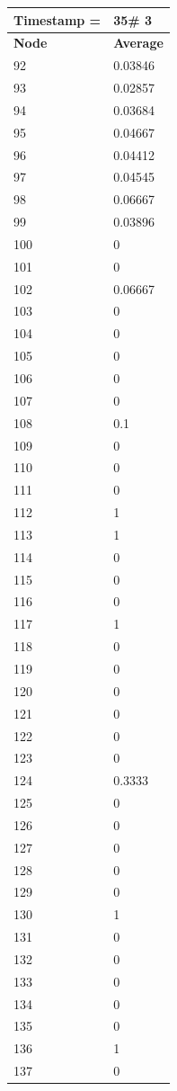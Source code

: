 \begin{tabular}{|l||l|}
\hline
\textbf{Timestamp =} & \textbf{35}\# 3\\\hline
	\textbf{Node} & \textbf{Average} \\ \hline
\hline
	92 & 0.03846 \\ \hline
	93 & 0.02857 \\ \hline
	94 & 0.03684 \\ \hline
	95 & 0.04667 \\ \hline
	96 & 0.04412 \\ \hline
	97 & 0.04545 \\ \hline
	98 & 0.06667 \\ \hline
	99 & 0.03896 \\ \hline
	100 & 0 \\ \hline
	101 & 0 \\ \hline
	102 & 0.06667 \\ \hline
	103 & 0 \\ \hline
	104 & 0 \\ \hline
	105 & 0 \\ \hline
	106 & 0 \\ \hline
	107 & 0 \\ \hline
	108 & 0.1 \\ \hline
	109 & 0 \\ \hline
	110 & 0 \\ \hline
	111 & 0 \\ \hline
	112 & 1 \\ \hline
	113 & 1 \\ \hline
	114 & 0 \\ \hline
	115 & 0 \\ \hline
	116 & 0 \\ \hline
	117 & 1 \\ \hline
	118 & 0 \\ \hline
	119 & 0 \\ \hline
	120 & 0 \\ \hline
	121 & 0 \\ \hline
	122 & 0 \\ \hline
	123 & 0 \\ \hline
	124 & 0.3333 \\ \hline
	125 & 0 \\ \hline
	126 & 0 \\ \hline
	127 & 0 \\ \hline
	128 & 0 \\ \hline
	129 & 0 \\ \hline
	130 & 1 \\ \hline
	131 & 0 \\ \hline
	132 & 0 \\ \hline
	133 & 0 \\ \hline
	134 & 0 \\ \hline
	135 & 0 \\ \hline
	136 & 1 \\ \hline
	137 & 0 \\ \hline
\end{tabular}

